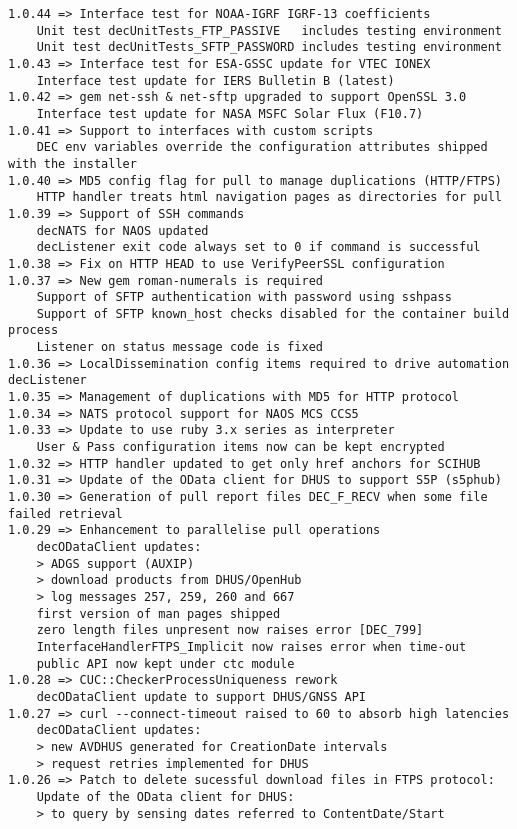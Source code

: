 \documentclass[dec_sum_main.tex]{subfiles}
\begin{document}
\begin{Verbatim}[tabsize=4]
1.0.44 => Interface test for NOAA-IGRF IGRF-13 coefficients
    Unit test decUnitTests_FTP_PASSIVE   includes testing environment
    Unit test decUnitTests_SFTP_PASSWORD includes testing environment
1.0.43 => Interface test for ESA-GSSC update for VTEC IONEX
    Interface test update for IERS Bulletin B (latest)
1.0.42 => gem net-ssh & net-sftp upgraded to support OpenSSL 3.0
    Interface test update for NASA MSFC Solar Flux (F10.7)
1.0.41 => Support to interfaces with custom scripts
    DEC env variables override the configuration attributes shipped with the installer
1.0.40 => MD5 config flag for pull to manage duplications (HTTP/FTPS)
    HTTP handler treats html navigation pages as directories for pull
1.0.39 => Support of SSH commands
    decNATS for NAOS updated
    decListener exit code always set to 0 if command is successful
1.0.38 => Fix on HTTP HEAD to use VerifyPeerSSL configuration
1.0.37 => New gem roman-numerals is required
    Support of SFTP authentication with password using sshpass
    Support of SFTP known_host checks disabled for the container build process
    Listener on status message code is fixed
1.0.36 => LocalDissemination config items required to drive automation decListener
1.0.35 => Management of duplications with MD5 for HTTP protocol
1.0.34 => NATS protocol support for NAOS MCS CCS5
1.0.33 => Update to use ruby 3.x series as interpreter
    User & Pass configuration items now can be kept encrypted
1.0.32 => HTTP handler updated to get only href anchors for SCIHUB
1.0.31 => Update of the OData client for DHUS to support S5P (s5phub)
1.0.30 => Generation of pull report files DEC_F_RECV when some file failed retrieval
1.0.29 => Enhancement to parallelise pull operations
    decODataClient updates:
    > ADGS support (AUXIP)
    > download products from DHUS/OpenHub
    > log messages 257, 259, 260 and 667
    first version of man pages shipped
    zero length files unpresent now raises error [DEC_799]
    InterfaceHandlerFTPS_Implicit now raises error when time-out
    public API now kept under ctc module
1.0.28 => CUC::CheckerProcessUniqueness rework
    decODataClient update to support DHUS/GNSS API
1.0.27 => curl --connect-timeout raised to 60 to absorb high latencies
    decODataClient updates:
    > new AVDHUS generated for CreationDate intervals
    > request retries implemented for DHUS
1.0.26 => Patch to delete sucessful download files in FTPS protocol:
    Update of the OData client for DHUS:
    > to query by sensing dates referred to ContentDate/Start

\end{Verbatim}
\end{document}
